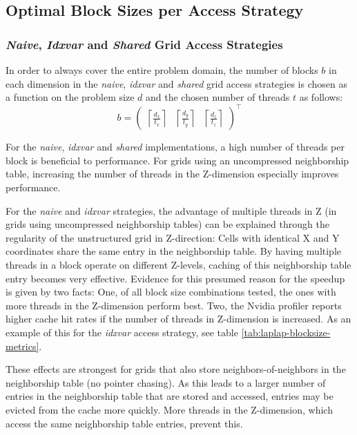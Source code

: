 \subsection{Optimal Block Sizes per Access Strategy}

\subsubsection{\emph{Naive}, \emph{Idxvar} and \emph{Shared} Grid Access Strategies}
In order to always cover the entire problem domain, the number of blocks $b$ in each dimension in the \emph{naive}, \emph{idxvar} and \emph{shared} grid access strategies is chosen as a function on the problem size $d$ and the chosen number of threads $t$ as follows:
$$b = \begin{pmatrix}\left\lceil\frac{d_x}{t_x}\right\rceil & \left\lceil\frac{d_y}{t_y}\right\rceil & \left\lceil\frac{d_z}{t_z}\right\rceil\end{pmatrix}^\top$$

For the \emph{naive}, \emph{idxvar} and \emph{shared} implementations, a high number of threads per block is beneficial to performance. For grids using an uncompressed neighborship table, increasing the number of threads in the Z-dimension especially improves performance.

For the \emph{naive} and \emph{idxvar} strategies, the advantage of multiple threads in Z (in grids using uncompressed neighborship tables) can be explained through the regularity of the unstructured grid in Z-direction: Cells with identical X and Y coordinates share the same entry in the neighborship table. By having multiple threads in a block operate on different Z-levels, caching of this neighborship table entry becomes very effective. Evidence for this presumed reason for the speedup is given by two facts: One, of all block size combinations tested, the ones with more threads in the Z-dimension perform best. Two, the Nvidia profiler reports higher cache hit rates if the number of threads in Z-dimension is increased. As an example of this for the \emph{idxvar} access strategy, see table \ref{tab:laplap-blocksize-metrics}.

These effects are strongest for grids that also store neighbors-of-neighbors in the neighborship table (no pointer chasing). As this leads to a larger number of entries in the neighborship table that are stored and accessed, entries may be evicted from the cache more quickly. More threads in the Z-dimension, which access the same neighborship table entries, prevent this.

